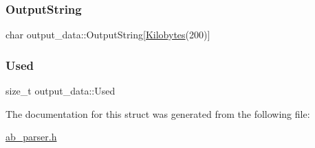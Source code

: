 \mbox{\label{structoutput__data_a4b5cddf8fc02cfb5219eafd71e3b3645}} 
\subsubsection{\texorpdfstring{Output\+String}{OutputString}}
{\footnotesize\ttfamily char output\+\_\+data\+::\+Output\+String\mbox{[}\hyperlink{ab__common_8h_a9e89c74d1fedd0a954107d7ab01481cc}{Kilobytes}(200)\mbox{]}}

\mbox{\label{structoutput__data_ac960304f0c5df1d42068abe8bb6a362a}} 
\subsubsection{\texorpdfstring{Used}{Used}}
{\footnotesize\ttfamily size\+\_\+t output\+\_\+data\+::\+Used}



The documentation for this struct was generated from the following file\+:\begin{DoxyCompactItemize}
\item 
\hyperlink{ab__parser_8h}{ab\+\_\+parser.\+h}\end{DoxyCompactItemize}
